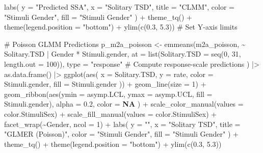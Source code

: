 \documentclass[
  bookmarksnumbered]{article}
\newenvironment{Shaded}{\begin{snugshade}}{\end{snugshade}}
\newcommand{\AttributeTok}[1]{\textcolor[rgb]{0.80,0.80,0.80}{#1}}
\newcommand{\CommentTok}[1]{\textcolor[rgb]{0.50,0.62,0.50}{#1}}
\newcommand{\ConstantTok}[1]{\textcolor[rgb]{0.86,0.64,0.64}{\textbf{#1}}}
\newcommand{\DecValTok}[1]{\textcolor[rgb]{0.86,0.86,0.80}{#1}}
\newcommand{\FloatTok}[1]{\textcolor[rgb]{0.75,0.75,0.82}{#1}}
\newcommand{\FunctionTok}[1]{\textcolor[rgb]{0.94,0.94,0.56}{#1}}
\newcommand{\NormalTok}[1]{\textcolor[rgb]{0.80,0.80,0.80}{#1}}
\newcommand{\OtherTok}[1]{\textcolor[rgb]{0.94,0.94,0.56}{#1}}
\newcommand{\SpecialCharTok}[1]{\textcolor[rgb]{0.86,0.64,0.64}{#1}}
\newcommand{\StringTok}[1]{\textcolor[rgb]{0.80,0.58,0.58}{#1}}
\begin{document}
\begin{Shaded}
\begin{Highlighting}[]
  \FunctionTok{labs}\NormalTok{(}
    \AttributeTok{y =} \StringTok{"Predicted SSA"}\NormalTok{, }\AttributeTok{x =} \StringTok{"Solitary TSD"}\NormalTok{, }\AttributeTok{title =} \StringTok{"CLMM"}\NormalTok{,}
    \AttributeTok{color =} \StringTok{"Stimuli Gender"}\NormalTok{, }\AttributeTok{fill =} \StringTok{"Stimuli Gender"}
\NormalTok{  ) }\SpecialCharTok{+}
  \FunctionTok{theme\_tq}\NormalTok{() }\SpecialCharTok{+}
  \FunctionTok{theme}\NormalTok{(}\AttributeTok{legend.position =} \StringTok{"bottom"}\NormalTok{) }\SpecialCharTok{+}
  \FunctionTok{ylim}\NormalTok{(}\FunctionTok{c}\NormalTok{(}\FloatTok{0.3}\NormalTok{, }\FloatTok{5.3}\NormalTok{)) }\CommentTok{\# Set Y{-}axis limits}

\CommentTok{\# Poisson GLMM Predictions}
\NormalTok{p\_m2a\_poisson }\OtherTok{\textless{}{-}} \FunctionTok{emmeans}\NormalTok{(m2a\_poisson, }\SpecialCharTok{\textasciitilde{}}\NormalTok{ Solitary.TSD }\SpecialCharTok{|}\NormalTok{ Gender }\SpecialCharTok{*}\NormalTok{ Stimuli.gender,}
  \AttributeTok{at =} \FunctionTok{list}\NormalTok{(}\AttributeTok{Solitary.TSD =} \FunctionTok{seq}\NormalTok{(}\DecValTok{0}\NormalTok{, }\DecValTok{31}\NormalTok{, }\AttributeTok{length.out =} \DecValTok{100}\NormalTok{)),}
  \AttributeTok{type =} \StringTok{"response"} \CommentTok{\# Compute response{-}scale predictions}
\NormalTok{) }\SpecialCharTok{|\textgreater{}}
  \FunctionTok{as.data.frame}\NormalTok{() }\SpecialCharTok{|\textgreater{}}
  \FunctionTok{ggplot}\NormalTok{(}\FunctionTok{aes}\NormalTok{(}
    \AttributeTok{x =}\NormalTok{ Solitary.TSD, }\AttributeTok{y =}\NormalTok{ rate,}
    \AttributeTok{color =}\NormalTok{ Stimuli.gender, }\AttributeTok{fill =}\NormalTok{ Stimuli.gender}
\NormalTok{  )) }\SpecialCharTok{+}
  \FunctionTok{geom\_line}\NormalTok{(}\AttributeTok{size =} \DecValTok{1}\NormalTok{) }\SpecialCharTok{+}
  \FunctionTok{geom\_ribbon}\NormalTok{(}\FunctionTok{aes}\NormalTok{(}\AttributeTok{ymin =}\NormalTok{ asymp.LCL, }\AttributeTok{ymax =}\NormalTok{ asymp.UCL, }\AttributeTok{fill =}\NormalTok{ Stimuli.gender),}
    \AttributeTok{alpha =} \FloatTok{0.2}\NormalTok{, }\AttributeTok{color =} \ConstantTok{NA}
\NormalTok{  ) }\SpecialCharTok{+}
  \FunctionTok{scale\_color\_manual}\NormalTok{(}\AttributeTok{values =}\NormalTok{ color.StimuliSex) }\SpecialCharTok{+}
  \FunctionTok{scale\_fill\_manual}\NormalTok{(}\AttributeTok{values =}\NormalTok{ color.StimuliSex) }\SpecialCharTok{+}
  \FunctionTok{facet\_wrap}\NormalTok{(}\SpecialCharTok{\textasciitilde{}}\NormalTok{Gender, }\AttributeTok{ncol =} \DecValTok{1}\NormalTok{) }\SpecialCharTok{+}
  \FunctionTok{labs}\NormalTok{(}
    \AttributeTok{y =} \StringTok{""}\NormalTok{, }\AttributeTok{x =} \StringTok{"Solitary TSD"}\NormalTok{, }\AttributeTok{title =} \StringTok{"GLMER (Poisson)"}\NormalTok{,}
    \AttributeTok{color =} \StringTok{"Stimuli Gender"}\NormalTok{, }\AttributeTok{fill =} \StringTok{"Stimuli Gender"}
\NormalTok{  ) }\SpecialCharTok{+}
  \FunctionTok{theme\_tq}\NormalTok{() }\SpecialCharTok{+}
  \FunctionTok{theme}\NormalTok{(}\AttributeTok{legend.position =} \StringTok{"bottom"}\NormalTok{) }\SpecialCharTok{+}
  \FunctionTok{ylim}\NormalTok{(}\FunctionTok{c}\NormalTok{(}\FloatTok{0.3}\NormalTok{, }\FloatTok{5.3}\NormalTok{))}


\end{Highlighting}
\end{Shaded}
\end{document}
